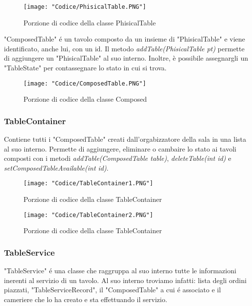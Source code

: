 \documentclass{article}
\begin{document}
\begin{figure}[!h]
\centering
\texttt{[image: "Codice/PhisicalTable.PNG"]}
\caption{Porzione di codice della classe PhisicalTable}
\end{figure}


\noindent "ComposedTable" \'e un tavolo composto da un insieme di "PhisicalTable" e viene identificato, anche lui, con un id. Il metodo \textit{addTable(PhisicalTable pt)} permette di aggiungere un "PhisicalTable" al suo interno. Inoltre, è possibile assegnargli un "TableState" per contassegnare lo stato in cui si trova.

\begin{figure}[!h]
\centering
\texttt{[image: "Codice/ComposedTable.PNG"]}
\caption{Porzione di codice della classe Composed}
\end{figure}

\subsubsection{TableContainer}

Contiene tutti i "ComposedTable" creati dall'orgabizzatore della sala in una lista al suo interno. Permette di aggiungere, eliminare o cambaire lo stato ai tavoli composti con i metodi \textit{addTable(ComposedTable table)}, \textit{deleteTable(int id)} e \textit{setComposedTableAvailable(int id)}.

\begin{figure}[!h]
\centering
\texttt{[image: "Codice/TableContainer1.PNG"]}
\caption{Porzione di codice della classe TableContainer}
\end{figure}


\begin{figure}[!h]
\centering
\texttt{[image: "Codice/TableContainer2.PNG"]}
\caption{Porzione di codice della classe TableContainer}
\end{figure}

\newpage

\subsubsection{TableService}

"TableService" \'e una classe che raggruppa al suo interno tutte le informazioni inerenti al servizio di un tavolo. Al suo interno troviamo infatti: lista degli ordini piazzati, "TableServiceRecord", il "ComposedTable" a cui \'e associato e il cameriere che lo ha creato e sta effettuando il servizio.
\end{document}
